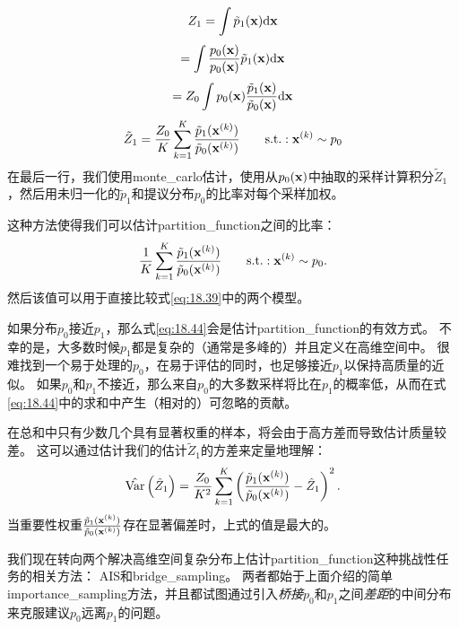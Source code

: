 
\begin{equation}
	Z_1 = \int \tilde{p}_1 (\mathbf{x}) \mathrm{d} \mathbf{x} 
\end{equation}
\begin{equation}
	= \int  \frac{ p_0(\mathbf{x}) }{ p_0(\mathbf{x}) }   \tilde{p}_1 (\mathbf{x}) \mathrm{d} \mathbf{x} 
\end{equation}
\begin{equation}
	= Z_0 \int  p_0(\mathbf{x})   \frac{ \tilde{p}_1 (\mathbf{x}) }{ \tilde{p}_0 (\mathbf{x}) } \mathrm{d} \mathbf{x} 
\end{equation}
\begin{equation}
\label{eq:18.44}
	\tilde{Z}_1 = \frac{Z_0}{K} \sum_{k=1}^K \frac{ \tilde{p}_1(\mathbf{x}^{(k)})  }{ \tilde{p}_0(\mathbf{x}^{(k)}) }  \quad\quad \text{s.t.}: \mathbf{x}^{(k)} \sim p_0
\end{equation}
在最后一行，我们使用\gls{monte_carlo}估计，使用从$p_0(\mathbf{x})$中抽取的采样计算积分$\tilde{Z}_1$，然后用未归一化的$\tilde{p}_1$和提议分布$p_0$的比率对每个采样加权。


这种方法使得我们可以估计\gls{partition_function}之间的比率：
\begin{equation}
	\frac{1}{K} \sum_{k=1}^K \frac{ \tilde{p}_1 (\mathbf{x}^{(k)}) }{ \tilde{p}_0 (\mathbf{x}^{(k)}) }
	\quad\quad \text{s.t.}: \mathbf{x}^{(k)} \sim p_0.
\end{equation}
然后该值可以用于直接比较式\ref{eq:18.39}中的两个模型。


如果分布$p_0$接近$p_1$，那么式\ref{eq:18.44}会是估计\gls{partition_function}的有效方式\citep{Minka_2005}。
不幸的是，大多数时候$p_1$都是复杂的（通常是多峰的）并且定义在高维空间中。
很难找到一个易于处理的$p_0$，在易于评估的同时，也足够接近$p_1$以保持高质量的近似。
如果$p_0$和$p_1$不接近，那么来自$p_0$的大多数采样将比在$p_1$的概率低，从而在式\ref{eq:18.44}中的求和中产生（相对的）可忽略的贡献。


在总和中只有少数几个具有显著权重的样本，将会由于高方差而导致估计质量较差。
这可以通过估计我们的估计$\tilde{Z}_1$的方差来定量地理解：
\begin{equation}
	\hat{\text{Var}} \left( \hat{Z}_1 \right)  = \frac{Z_0 }{K^2} \sum_{k=1}^K
\left(  \frac{ \tilde{p}_1(\mathbf{x}^{(k)}) }{  \tilde{p}_0(\mathbf{x}^{(k)}) } - \hat{Z}_1  \right)^2.
\end{equation}
当重要性权重$\frac{ \tilde{p}_1(\mathbf{x}^{(k)}) }{ \tilde{p}_0(\mathbf{x}^{(k)}) } $存在显著偏差时，上式的值是最大的。


我们现在转向两个解决高维空间复杂分布上估计\gls{partition_function}这种挑战性任务的相关方法：
\gls{AIS}和\gls{bridge_sampling}。
两者都始于上面介绍的简单\gls{importance_sampling}方法，并且都试图通过引入\emph{桥接}$p_0$和$p_1$之间\emph{差距}的中间分布来克服建议$p_0$远离$p_1$的问题。


